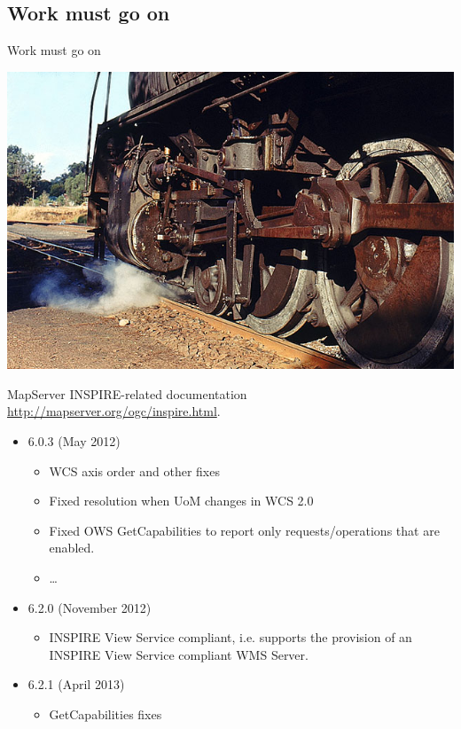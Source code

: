 \documentclass[xcolor=dvipsnames]{beamer}
\begin{document}
\subsection{Work must go on}
\begin{frame}{Work must go on}
    \begin{center} 
        \includegraphics[width=\textwidth]{imgs/ils/engine.jpg}
    \end{center}
\end{frame}


\begin{frame}{MapServer}
    INSPIRE-related documentation
    \url{http://mapserver.org/ogc/inspire.html}. 

\begin{itemize}
    \item 6.0.3 (May 2012)
        \begin{itemize}
            \item WCS axis order and other fixes
            \item Fixed resolution when UoM changes in WCS 2.0
            \item Fixed OWS GetCapabilities to report only requests/operations that are enabled.
            \item \dots
        \end{itemize}
        \pause
    \item 6.2.0 (November 2012)
        \begin{itemize}
            \item INSPIRE View Service compliant, i.e. supports the provision of an INSPIRE View Service compliant WMS Server.
        \end{itemize}
        \pause
    \item 6.2.1 (April 2013)
        \begin{itemize}
            \item GetCapabilities fixes
        \end{itemize}
\end{itemize}
\end{frame}
\end{document}
